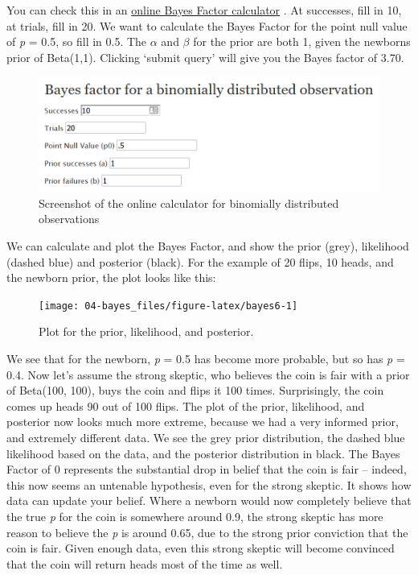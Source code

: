 \documentclass[
  oneside]{book}
\begin{document}
You can check this in an \href{http://pcl.missouri.edu/bf-binomial}{online Bayes Factor calculator} \citep{rouder_bayesian_2009}. At successes, fill in 10, at trials, fill in 20. We want to calculate the Bayes Factor for the point null value of \emph{p} = 0.5, so fill in 0.5. The \(\alpha\) and \(\beta\) for the prior are both 1, given the newborns prior of Beta(1,1). Clicking `submit query' will give you the Bayes factor of 3.70.

\begin{figure}

{\centering \includegraphics[width=1\linewidth]{images/binombayesonline} 

}

\caption{Screenshot of the online calculator for binomially distributed observations}\label{fig:gpower-screenshot-bayes}
\end{figure}

We can calculate and plot the Bayes Factor, and show the prior (grey), likelihood (dashed blue) and posterior (black). For the example of 20 flips, 10 heads, and the newborn prior, the plot looks like this:

\begin{figure}

{\centering \texttt{[image: 04-bayes\_files/figure-latex/bayes6-1]} 

}

\caption{Plot for the prior, likelihood, and posterior.}\label{fig:bayes6}
\end{figure}

We see that for the newborn, \emph{p} = 0.5 has become more probable, but so has \emph{p} = 0.4. Now let's assume the strong skeptic, who believes the coin is fair with a prior of Beta(100, 100), buys the coin and flips it 100 times. Surprisingly, the coin comes up heads 90 out of 100 flips. The plot of the prior, likelihood, and posterior now looks much more extreme, because we had a very informed prior, and extremely different data. We see the grey prior distribution, the dashed blue likelihood based on the data, and the posterior distribution in black. The Bayes Factor of 0 represents the substantial drop in belief that the coin is fair -- indeed, this now seems an untenable hypothesis, even for the strong skeptic. It shows how data can update your belief. Where a newborn would now completely believe that the true \emph{p} for the coin is somewhere around 0.9, the strong skeptic has more reason to believe the \emph{p} is around 0.65, due to the strong prior conviction that the coin is fair. Given enough data, even this strong skeptic will become convinced that the coin will return heads most of the time as well.
\end{document}
